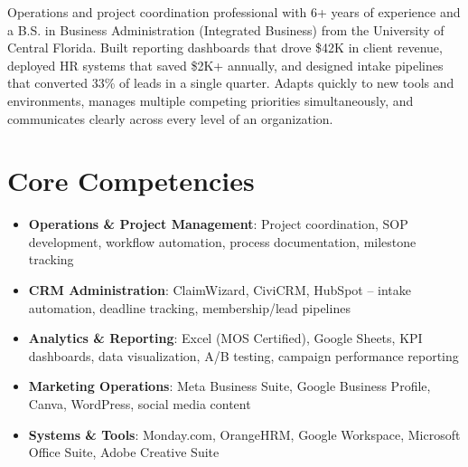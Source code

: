 \documentclass[11pt,a4paper,sans]{moderncv}
\begin{document}
\makecvtitle


\vspace{6pt}
\small{Operations and project coordination professional with 6+ years of experience and a B.S. in Business Administration (Integrated Business) from the University of Central Florida. Built reporting dashboards that drove \$42K in client revenue, deployed HR systems that saved \$2K+ annually, and designed intake pipelines that converted 33\% of leads in a single quarter. Adapts quickly to new tools and environments, manages multiple competing priorities simultaneously, and communicates clearly across every level of an organization.}


\section{Core Competencies}
\vspace{1pt}
\begin{itemize}

\item \textbf{Operations \& Project Management}: Project coordination, SOP development, workflow automation, process documentation, milestone tracking

\item \textbf{CRM Administration}: ClaimWizard, CiviCRM, HubSpot -- intake automation, deadline tracking, membership/lead pipelines

\item \textbf{Analytics \& Reporting}: Excel (MOS Certified), Google Sheets, KPI dashboards, data visualization, A/B testing, campaign performance reporting

\item \textbf{Marketing Operations}: Meta Business Suite, Google Business Profile, Canva, WordPress, social media content

\item \textbf{Systems \& Tools}: Monday.com, OrangeHRM, Google Workspace, Microsoft Office Suite, Adobe Creative Suite

\end{itemize}

\end{document}

